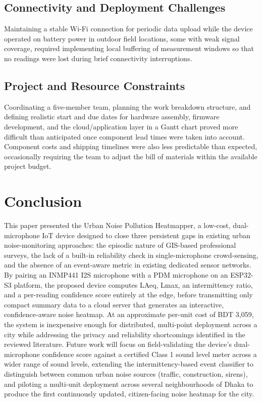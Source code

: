 \documentclass[conference]{IEEEtran}
\begin{document}
\subsection{Connectivity and Deployment Challenges}
Maintaining a stable Wi-Fi connection for periodic data upload while the device operated on battery power in outdoor field locations, some with weak signal coverage, required implementing local buffering of measurement windows so that no readings were lost during brief connectivity interruptions.

\subsection{Project and Resource Constraints}
Coordinating a five-member team, planning the work breakdown structure, and defining realistic start and due dates for hardware assembly, firmware development, and the cloud/application layer in a Gantt chart proved more difficult than anticipated once component lead times were taken into account. Component costs and shipping timelines were also less predictable than expected, occasionally requiring the team to adjust the bill of materials within the available project budget.

\section{Conclusion}
This paper presented the Urban Noise Pollution Heatmapper, a low-cost, dual-microphone IoT device designed to close three persistent gaps in existing urban noise-monitoring approaches: the episodic nature of GIS-based professional surveys, the lack of a built-in reliability check in single-microphone crowd-sensing, and the absence of an event-aware metric in existing dedicated sensor networks. By pairing an INMP441 I2S microphone with a PDM microphone on an ESP32-S3 platform, the proposed device computes LAeq, Lmax, an intermittency ratio, and a per-reading confidence score entirely at the edge, before transmitting only compact summary data to a cloud server that generates an interactive, confidence-aware noise heatmap. At an approximate per-unit cost of BDT 3,059, the system is inexpensive enough for distributed, multi-point deployment across a city while addressing the privacy and reliability shortcomings identified in the reviewed literature. Future work will focus on field-validating the device's dual-microphone confidence score against a certified Class 1 sound level meter across a wider range of sound levels, extending the intermittency-based event classifier to distinguish between common urban noise sources (traffic, construction, sirens), and piloting a multi-unit deployment across several neighbourhoods of Dhaka to produce the first continuously updated, citizen-facing noise heatmap for the city.
\end{document}
